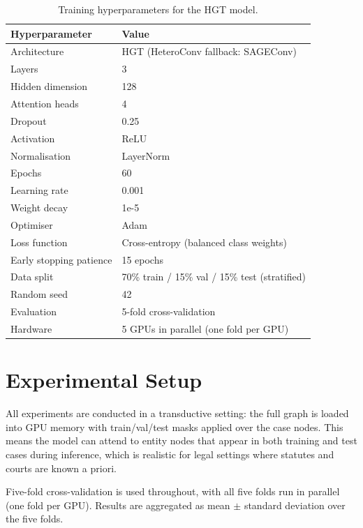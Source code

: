 \documentclass[12pt,a4paper]{report}
\begin{document}
\begin{table}[H]
  \centering
  \caption{Training hyperparameters for the HGT model.}
  \label{tab:training_config}
  \begin{tabular}{ll}
    \toprule
    \textbf{Hyperparameter} & \textbf{Value} \\
    \midrule
    Architecture & HGT (HeteroConv fallback: SAGEConv) \\
    Layers & 3 \\
    Hidden dimension & 128 \\
    Attention heads & 4 \\
    Dropout & 0.25 \\
    Activation & ReLU \\
    Normalisation & LayerNorm \\
    Epochs & 60 \\
    Learning rate & 0.001 \\
    Weight decay & 1e-5 \\
    Optimiser & Adam \\
    Loss function & Cross-entropy (balanced class weights) \\
    Early stopping patience & 15 epochs \\
    Data split & 70\% train / 15\% val / 15\% test (stratified) \\
    Random seed & 42 \\
    Evaluation & 5-fold cross-validation \\
    Hardware & 5 GPUs in parallel (one fold per GPU) \\
    \bottomrule
  \end{tabular}
\end{table}

\section{Experimental Setup}
\label{sec:experimental_setup}

All experiments are conducted in a transductive setting: the full graph is loaded into GPU memory with train/val/test masks applied over the case nodes. This means the model can attend to entity nodes that appear in both training and test cases during inference, which is realistic for legal settings where statutes and courts are known a priori.

Five-fold cross-validation is used throughout, with all five folds run in parallel (one fold per GPU). Results are aggregated as mean $\pm$ standard deviation over the five folds.
\end{document}
